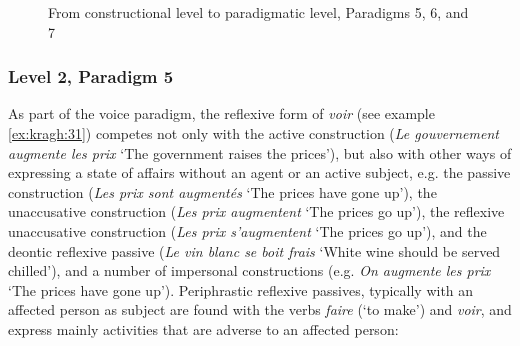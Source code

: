 \documentclass[output=paper]{langsci/langscibook}
\begin{document}
\begin{figure}

 \caption{From constructional level to paradigmatic level, Paradigms 5, 6, and 7\label{fig:kragh:7}}
 \end{figure}


 \subsubsection{Level 2, Paradigm 5} \label{kragh:4.3.1}


As part of the voice paradigm, the reflexive form of \textit{voir} (see example \ref{ex:kragh:31}) competes not only with the active construction (\textit{Le gouvernement augmente les prix} ‘The government raises the prices’), but also with other ways of expressing a state of affairs without an agent or an active subject, e.g. the passive construction (\textit{Les prix sont augmentés} ‘The prices have gone up’), the unaccusative construction (\textit{Les prix augmentent} ‘The prices go up’), the reflexive unaccusative construction (\textit{Les prix s’augmentent} ‘The prices go up’), and the deontic reflexive passive (\textit{Le vin blanc se boit frais} ‘White wine should be served chilled’), and a number of impersonal constructions (e.g. \textit{On augmente les prix} ‘The prices have gone up’). Periphrastic reflexive passives, typically with an affected person as subject are found with the verbs \textit{faire} (‘to make’) and \textit{voir}, and express mainly activities that are adverse to an affected person:
\end{document}
